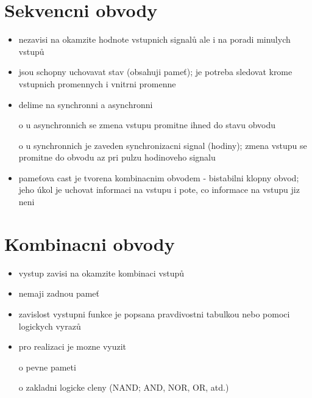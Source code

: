 \documentclass[a4paper,12pt]{article}
\begin{document}
\section{Sekvencni obvody}
    \begin{itemize}
        \item{nezavisi na okamzite hodnote vstupnich signalů ale i na poradi minulych vstupů}
        \item{jsou schopny uchovavat stav (obsahuji pameť); je potreba sledovat krome vstupnich promennych i vnitrni promenne}
        \item{delime na synchronni a asynchronni}
            \item[o] u asynchronnich se zmena vstupu promitne ihned do stavu obvodu
            \item[o] u synchronnich je zaveden synchronizacni signal (hodiny); zmena vstupu se promitne do obvodu az pri pulzu hodinoveho signalu
        \item{pameťova cast je tvorena kombinacnim obvodem - bistabilni klopny obvod; jeho úkol je uchovat informaci na vstupu i pote, co informace na vstupu jiz neni}
    \end{itemize}

\section{Kombinacni obvody}
    \begin{itemize}
        \item{vystup zavisi na okamzite kombinaci vstupů}
        \item{nemaji zadnou pameť}
        \item{zavislost vystupni funkce je popsana pravdivostni tabulkou nebo pomoci logickych vyrazů}
        \item{pro realizaci je mozne vyuzit}
            \item[o]{pevne pameti}
            \item[o]{zakladni logicke cleny (NAND; AND, NOR, OR, atd.)}
    \end{itemize}
    
\end{document}
